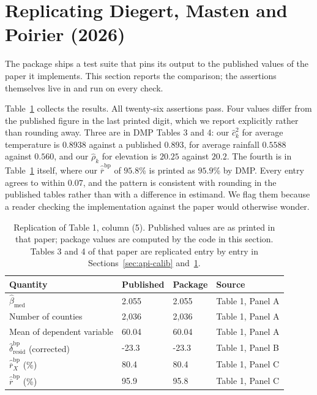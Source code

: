 \documentclass[article]{jss}\usepackage[]{graphicx}\usepackage[]{xcolor}
\begin{document}
\section{Replicating Diegert, Masten and Poirier (2026)}\label{sec:replication}

The package ships a test suite that pins its output to the published values
of the paper it implements. This section reports the comparison; the
assertions themselves live in
 and run on every check.



Table~\ref{tab:replication} collects the results. All twenty-six assertions
pass. Four values differ from the published figure in the last printed
digit, which we report explicitly rather than rounding away. Three are in
DMP Tables 3 and 4: our $\hat c_k^2$ for average temperature is $0.8938$
against a published $0.893$, for average rainfall $0.5588$ against
$0.560$, and our $\hat\rho_k$ for elevation is $20.25$ against $20.2$. The
fourth is in Table~\ref{tab:replication} itself, where our
$\hat{\overline{r}}^{\mathrm{bp}}$ of $95.8$\% is printed
as $95.9$\% by DMP. Every entry agrees to within $0.07$, and the pattern
is consistent with rounding in the published tables rather than with a
difference in estimand. We flag them because a reader checking the
implementation against the paper would otherwise wonder.

\begin{table}[t!]
\centering
\begin{tabular}{llll}
  \toprule
Quantity & Published & Package & Source \\ 
  \midrule
$\hat\beta_{\mathrm{med}}$ & 2.055 & 2.055 & Table 1, Panel A \\ 
  Number of counties & 2,036 & 2,036 & Table 1, Panel A \\ 
  Mean of dependent variable & 60.04 & 60.04 & Table 1, Panel A \\ 
  $\hat\delta^{\mathrm{bp}}_{\mathrm{resid}}$ (corrected) & -23.3 & -23.3 & Table 1, Panel B \\ 
  $\hat{\overline{r}}^{\mathrm{bp}}_X$ (\%) & 80.4 & 80.4 & Table 1, Panel C \\ 
  $\hat{\overline{r}}^{\mathrm{bp}}$ (\%) & 95.9 & 95.8 & Table 1, Panel C \\ 
   \bottomrule
\end{tabular}
\caption{Replication of \citet{Diegert2026} Table 1, column (5).
    Published values are as printed in that paper; package values are
    computed by the code in this section. Tables 3 and 4 of that paper are
    replicated entry by entry in Sections~\ref{sec:api-calib}
    and~\ref{sec:replication}.} 
\label{tab:replication}
\end{table}
\end{document}
